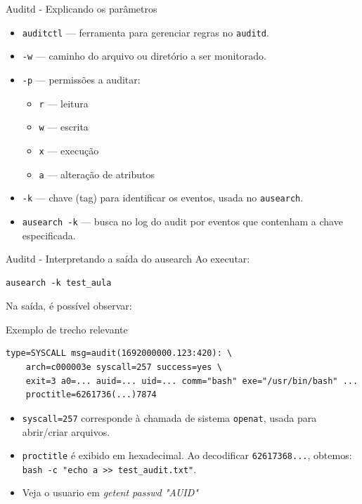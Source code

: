 \begin{frame}{Auditd - Explicando os parâmetros}
    \begin{itemize}
        \item \texttt{auditctl} — ferramenta para gerenciar regras no \texttt{auditd}.
        \item \texttt{-w} — caminho do arquivo ou diretório a ser monitorado.
        \item \texttt{-p} — permissões a auditar:
              \begin{itemize}
                  \item \texttt{r} — leitura
                  \item \texttt{w} — escrita
                  \item \texttt{x} — execução
                  \item \texttt{a} — alteração de atributos
              \end{itemize}
        \item \texttt{-k} — chave (tag) para identificar os eventos, usada no \texttt{ausearch}.
        \item \texttt{ausearch -k} — busca no log do audit por eventos que contenham a chave especificada.
    \end{itemize}
\end{frame}

\begin{frame}[fragile]{Auditd - Interpretando a saída do ausearch}
    Ao executar:
    \begin{verbatim}
ausearch -k test_aula
\end{verbatim}

    Na saída, é possível observar:

    \begin{block}{Exemplo de trecho relevante}
        \begin{verbatim}
type=SYSCALL msg=audit(1692000000.123:420): \
    arch=c000003e syscall=257 success=yes \
    exit=3 a0=... auid=... uid=... comm="bash" exe="/usr/bin/bash" ...
    proctitle=6261736(...)7874
\end{verbatim}
    \end{block}

    \begin{itemize}
        \item \texttt{syscall=257} corresponde à chamada de sistema \texttt{openat}, usada para abrir/criar arquivos.
        \item \texttt{proctitle} é exibido em hexadecimal.
              Ao decodificar \texttt{62617368...}, obtemos:
              \texttt{bash -c "echo a >> test\_audit.txt"}.

        \item Veja o usuario em \textit{getent passwd "AUID"}
    \end{itemize}
\end{frame}


